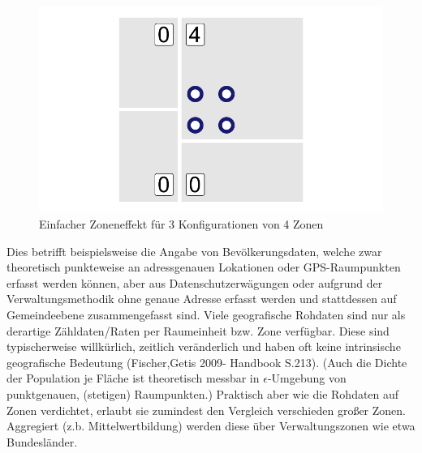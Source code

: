 \begin{figure}[htb]
\begin{minipage}[b]{.32\linewidth}
    \end{minipage}
    \hfill
    \begin{minipage}[b]{.32\linewidth}
       \includegraphics[width=\linewidth,trim={0.5cm 0.5cm 0.5cm 0.5cm},clip]{body/figures/43-maup_3.pdf}
    \end{minipage}
    \caption[Zoneneffekt]{Einfacher Zoneneffekt für 3 Konfigurationen von 4 Zonen }
    \label{fig_zoning}
 \end{figure}

Dies betrifft beispielsweise die Angabe von Bevölkerungsdaten, welche zwar theoretisch punkteweise an adressgenauen Lokationen oder GPS-Raumpunkten erfasst werden können, 
aber aus Datenschutzerwägungen oder aufgrund der Verwaltungsmethodik ohne genaue Adresse erfasst werden und stattdessen auf Gemeindeebene zusammengefasst sind. 
Viele geografische Rohdaten sind nur als derartige Zähldaten/Raten per Raumeinheit bzw. Zone verfügbar. 
Diese sind typischerweise willkürlich, zeitlich veränderlich und haben oft keine intrinsische geografische Bedeutung (Fischer,Getis 2009- Handbook S.213).
(Auch die Dichte der Population je Fläche ist theoretisch messbar in $\epsilon$-Umgebung von punktgenauen, (stetigen) Raumpunkten.) 
Praktisch aber wie die Rohdaten auf Zonen verdichtet, erlaubt sie zumindest den Vergleich verschieden großer Zonen.
Aggregiert (z.b. Mittelwertbildung) werden diese über Verwaltungszonen wie etwa Bundesländer.  

